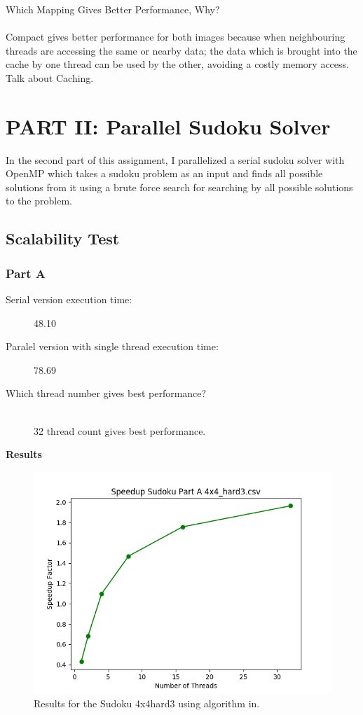 \documentclass{article}
\newcommand\tab[1][0.5cm]{\hspace*{#1}}
\begin{document}
Which Mapping Gives Better Performance, Why?\\
\\ \tab Compact gives better performance for both images because 
when neighbouring threads are accessing the same or nearby data;
the data which is brought into the cache by one thread can be used 
by the other, avoiding a costly memory access.
\\ Talk about Caching.

\newpage

\section{PART II: Parallel Sudoku Solver}
\tab In the second part of this assignment, I parallelized a serial sudoku solver with OpenMP
which takes a sudoku problem as an input and finds all possible solutions from it 
using a brute force search for searching by all possible solutions to the problem. 

\subsection{Scalability Test}
\subsubsection{Part A}
\begin{description}
\item[Serial version execution time: ] 48.10
\item[Paralel version with single thread execution time: ] 78.69
\item[Which thread number gives best performance?]\hfill \\
32 thread count gives best performance.
\end{description} 

\textbf{Results}
 \begin{figure}[!htb]
    \centering
        \includegraphics[width=0.8\linewidth]{./img/speedup_part_2_A.png}
        \caption{\small Results for the Sudoku 4x4hard3 using algorithm in.}
\end{figure}                
\end{document}
